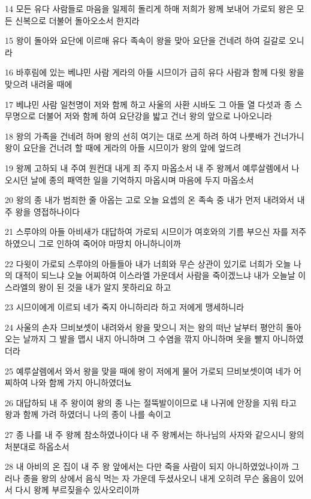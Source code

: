 \par 14 모든 유다 사람들로 마음을 일제히 돌리게 하매 저희가 왕께 보내어 가로되 왕은 모든 신복으로 더불어 돌아오소서 한지라
\par 15 왕이 돌아와 요단에 이르매 유다 족속이 왕을 맞아 요단을 건네려 하여 길갈로 오니라
\par 16 바후림에 있는 베냐민 사람 게라의 아들 시므이가 급히 유다 사람과 함께 다윗 왕을 맞으려 내려올 때에
\par 17 베냐민 사람 일천명이 저와 함께 하고 사울의 사환 시바도 그 아들 열 다섯과 종 스무명으로 더불어 저와 함께 하여 요단강을 밟고 건너 왕의 앞으로 나아오니라
\par 18 왕의 가족을 건네려 하며 왕의 선히 여기는 대로 쓰게 하려 하여 나룻배가 건너가니 왕이 요단을 건너려 할 때에 게라의 아들 시므이가 왕의 앞에 엎드려
\par 19 왕께 고하되 내 주여 원컨대 내게 죄 주지 마옵소서 내 주 왕께서 예루살렘에서 나오시던 날에 종의 패역한 일을 기억하지 마옵시며 마음에 두지 마옵소서
\par 20 왕의 종 내가 범죄한 줄 아옵는 고로 오늘 요셉의 온 족속 중 내가 먼저 내려와서 내 주 왕을 영접하나이다
\par 21 스루야의 아들 아비새가 대답하여 가로되 시므이가 여호와의 기름 부으신 자를 저주하였으니 그로 인하여 죽어야 마땅치 아니하니이까
\par 22 다윗이 가로되 스루야의 아들들아 내가 너희와 무슨 상관이 있기로 너희가 오늘 나의 대적이 되느냐 오늘 어찌하여 이스라엘 가운데서 사람을 죽이겠느냐 내가 오늘날 이스라엘의 왕이 된 것을 내가 알지 못하리요 하고
\par 23 시므이에게 이르되 네가 죽지 아니하리라 하고 저에게 맹세하니라
\par 24 사울의 손자 므비보셋이 내려와서 왕을 맞으니 저는 왕의 떠난 날부터 평안히 돌아오는 날까지 그 발을 맵시 내지 아니하며 그 수염을 깎지 아니하며 옷을 빨지 아니하였더라
\par 25 예루살렘에서 와서 왕을 맞을 때에 왕이 저에게 물어 가로되 므비보셋이여 네가 어찌하여 나와 함께 가지 아니하였더뇨
\par 26 대답하되 내 주 왕이여 왕의 종 나는 절뚝발이이므로 내 나귀에 안장을 지워 타고 왕과 함께 가려 하였더니 나의 종이 나를 속이고
\par 27 종 나를 내 주 왕께 참소하였나이다 내 주 왕께서는 하나님의 사자와 같으시니 왕의 처분대로 하옵소서
\par 28 내 아비의 온 집이 내 주 왕 앞에서는 다만 죽을 사람이 되지 아니하였었나이까 그러나 종을 왕의 상에서 음식 먹는 자 가운데 두셨사오니 내게 오히려 무슨 옳음이 있어서 다시 왕께 부르짖을수 있사오리이까
